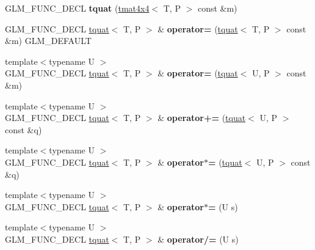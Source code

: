 \begin{DoxyCompactItemize}
\item 
\hypertarget{structglm_1_1tquat_a23adc00287e98ab1160acc353d5febc7}{G\-L\-M\-\_\-\-F\-U\-N\-C\-\_\-\-D\-E\-C\-L {\bfseries tquat} (\hyperlink{structglm_1_1tmat4x4}{tmat4x4}$<$ T, P $>$ const \&m)}\label{structglm_1_1tquat_a23adc00287e98ab1160acc353d5febc7}

\item 
\hypertarget{structglm_1_1tquat_a9133348e2b628f05b07ab6907cc5e4ef}{G\-L\-M\-\_\-\-F\-U\-N\-C\-\_\-\-D\-E\-C\-L \hyperlink{structglm_1_1tquat}{tquat}$<$ T, P $>$ \& {\bfseries operator=} (\hyperlink{structglm_1_1tquat}{tquat}$<$ T, P $>$ const \&m) G\-L\-M\-\_\-\-D\-E\-F\-A\-U\-L\-T}\label{structglm_1_1tquat_a9133348e2b628f05b07ab6907cc5e4ef}

\item 
\hypertarget{structglm_1_1tquat_af00985afe704157487281c4c3eb4f790}{{\footnotesize template$<$typename U $>$ }\\G\-L\-M\-\_\-\-F\-U\-N\-C\-\_\-\-D\-E\-C\-L \hyperlink{structglm_1_1tquat}{tquat}$<$ T, P $>$ \& {\bfseries operator=} (\hyperlink{structglm_1_1tquat}{tquat}$<$ U, P $>$ const \&m)}\label{structglm_1_1tquat_af00985afe704157487281c4c3eb4f790}

\item 
\hypertarget{structglm_1_1tquat_a6a659798636ad7f9d8cb392904b61020}{{\footnotesize template$<$typename U $>$ }\\G\-L\-M\-\_\-\-F\-U\-N\-C\-\_\-\-D\-E\-C\-L \hyperlink{structglm_1_1tquat}{tquat}$<$ T, P $>$ \& {\bfseries operator+=} (\hyperlink{structglm_1_1tquat}{tquat}$<$ U, P $>$ const \&q)}\label{structglm_1_1tquat_a6a659798636ad7f9d8cb392904b61020}

\item 
\hypertarget{structglm_1_1tquat_a3aaba279045f689985499e21aafd1ab8}{{\footnotesize template$<$typename U $>$ }\\G\-L\-M\-\_\-\-F\-U\-N\-C\-\_\-\-D\-E\-C\-L \hyperlink{structglm_1_1tquat}{tquat}$<$ T, P $>$ \& {\bfseries operator$\ast$=} (\hyperlink{structglm_1_1tquat}{tquat}$<$ U, P $>$ const \&q)}\label{structglm_1_1tquat_a3aaba279045f689985499e21aafd1ab8}

\item 
\hypertarget{structglm_1_1tquat_ac92bf2dc48e2c7e3f4976b25a5daf78a}{{\footnotesize template$<$typename U $>$ }\\G\-L\-M\-\_\-\-F\-U\-N\-C\-\_\-\-D\-E\-C\-L \hyperlink{structglm_1_1tquat}{tquat}$<$ T, P $>$ \& {\bfseries operator$\ast$=} (U s)}\label{structglm_1_1tquat_ac92bf2dc48e2c7e3f4976b25a5daf78a}

\item 
\hypertarget{structglm_1_1tquat_ab9348510c32247974addf29b37304b2b}{{\footnotesize template$<$typename U $>$ }\\G\-L\-M\-\_\-\-F\-U\-N\-C\-\_\-\-D\-E\-C\-L \hyperlink{structglm_1_1tquat}{tquat}$<$ T, P $>$ \& {\bfseries operator/=} (U s)}\label{structglm_1_1tquat_ab9348510c32247974addf29b37304b2b}

\end{DoxyCompactItemize}
